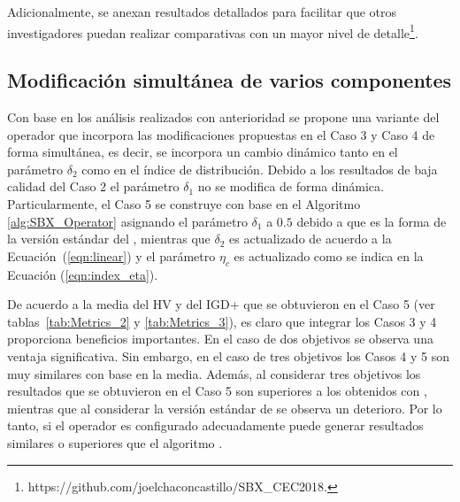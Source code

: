 %
%
Adicionalmente, se anexan resultados detallados para facilitar que otros investigadores puedan realizar comparativas con un mayor
nivel de detalle\footnote{https:\//\//github.com\//joelchaconcastillo\//SBX\_CEC2018.}.


\subsection{Modificación simultánea de varios componentes}

Con base en los análisis realizados con anterioridad se propone una variante del operador \SBX{} que incorpora las modificaciones propuestas
en el Caso 3 y Caso 4 de forma simultánea, es decir, se incorpora un cambio dinámico tanto en el parámetro $\delta_2$ como en el índice de distribución.
%
Debido a los resultados de baja calidad del Caso 2 el parámetro $\delta_1$ no se modifica de forma dinámica.
%
Particularmente, el Caso 5 se construye con base en el Algoritmo \ref{alg:SBX_Operator} asignando el parámetro $\delta_1$ a $0.5$ debido
a que es la forma de la versión estándar del \SBX{}, mientras que $\delta_2$ es actualizado de acuerdo a la Ecuación~(\ref{eqn:linear}) y
el parámetro $\eta_c$ es actualizado como se indica en la Ecuación (\ref{eqn:index_eta}).

De acuerdo a la media del HV y del IGD+ que se obtuvieron en el Caso 5 (ver tablas~\ref{tab:Metrics_2} y \ref{tab:Metrics_3}), es claro que integrar los 
Casos 3 y 4 proporciona beneficios importantes.
%
En el caso de dos objetivos se observa una ventaja significativa.
%
Sin embargo, en el caso de tres objetivos los Casos 4 y 5 son muy similares con base en la media.
%
Además, al considerar tres objetivos los resultados que se obtuvieron en el Caso 5 son superiores a los obtenidos con \DE{}, 
mientras que al considerar la versión estándar de \SBX{} se observa un deterioro.
%
Por lo tanto, si el operador \SBX{} es configurado adecuadamente puede generar resultados similares o superiores que el algoritmo \DEMO{}. 

